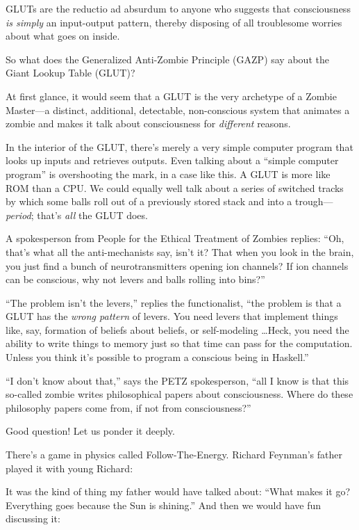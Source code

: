 {
 GLUTs are the reductio ad absurdum to anyone who suggests that
consciousness \textit{is simply} an input-output pattern, thereby
disposing of all troublesome worries about what goes on inside.}

{
 So what does the Generalized Anti-Zombie Principle (GAZP) say
about the Giant Lookup Table (GLUT)?}

{
 At first glance, it would seem that a GLUT is the very archetype
of a Zombie Master---a distinct, additional, detectable, non-conscious
system that animates a zombie and makes it talk about consciousness for
\textit{different} reasons.}

{
 In the interior of the GLUT, there's merely a very
simple computer program that looks up inputs and retrieves outputs.
Even talking about a ``simple computer
program'' is overshooting the mark, in a case like
this. A GLUT is more like ROM than a CPU. We could equally well talk
about a series of switched tracks by which some balls roll out of a
previously stored stack and into a trough---\textit{period};
that's \textit{all} the GLUT does.}

{
 A spokesperson from People for the Ethical Treatment of Zombies
replies: ``Oh, that's what all the
anti-mechanists say, isn't it? That when you look in
the brain, you just find a bunch of neurotransmitters opening ion
channels? If ion channels can be conscious, why not levers and balls
rolling into bins?''}

{
 ``The problem isn't the
levers,'' replies the functionalist,
``the problem is that a GLUT has the \textit{wrong
pattern} of levers. You need levers that implement things like, say,
formation of beliefs about beliefs, or self-modeling \ldots Heck, you
need the ability to write things to memory just so that time can pass
for the computation. Unless you think it's possible to
program a conscious being in Haskell.''}

{
 ``I don't know about
that,'' says the PETZ spokesperson,
``all I know is that this so-called zombie writes
philosophical papers about consciousness. Where do these philosophy
papers come from, if not from consciousness?''}

{
 Good question! Let us ponder it deeply.}

{
 There's a game in physics called
Follow-The-Energy. Richard Feynman's father played it
with young Richard:}

{
 It was the kind of thing my father would have talked about:
``What makes it go? Everything goes because the Sun is
shining.'' And then we would have fun discussing it:}

